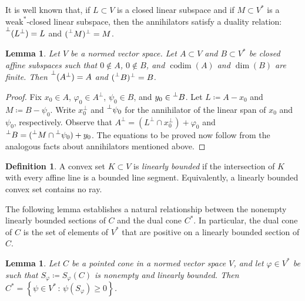 \documentclass[10pt]{amsart}
\newtheorem{lemma}[thm]{Lemma}
\theoremstyle{definition}
\newtheorem{definition}[thm]{Definition}
\theoremstyle{remark}
\begin{document}
It is well known that, if $L \subset V$ is a closed linear
subspace and if $M \subset {{V}^{\ast}}$ is a {$\text{weak}^{\ast}$}-closed linear
subspace, then the annihilators satisfy a duality relation:
${\prescript{\perp}{}{{(L^{\perp})}}} = L$ and $({\prescript{\perp}{}{{M}}})^{\perp} = M$.

\begin{lemma}
   \label{lem:PerpIsADuality}
   Let $V$ be a normed vector space.  Let $A \subset V$ and $B
   \subset {{V}^{\ast}}$ be closed affine subspaces such that $0
   \notin A$, $0 \notin B$, and ${\operatorname{codim}}(A)$ and $\dim(B)$ are
   finite.  Then ${\prescript{\perp}{}{{(A^{\perp})}}} = A$ and
   $({\prescript{\perp}{}{{B}}})^{\perp} = B$.
\end{lemma}

\begin{proof}
   Fix $x_{0} \in A$, ${\varphi}_{0} \in A^{\perp}$, $\psi_{0} \in B$,
   and $y_{0} \in {\prescript{\perp}{}{{B}}}$.  Let $L {\mathrel{\coloneqq}} A - x_{0}$ and $M
   {\mathrel{\coloneqq}} B - \psi_{0}$.  Write $x_{0}^{\perp}$ and
   ${\prescript{\perp}{}{{\psi_{0}}}}$ for the annihilator of the linear span of
   $x_{0}$ and $\psi_{0}$, respectively.  Observe that $A^{\perp}
   = (L^{\perp} \cap x_{0}^{\perp}) + {\varphi}_{0}$ and ${\prescript{\perp}{}{{B}}} =
   ({\prescript{\perp}{}{{M}}} \cap {\prescript{\perp}{}{{\psi_{0}}}}) + y_{0}$.  The equations to
   be proved now follow from the analogous facts about
   annihilators mentioned above.
\end{proof}

\begin{definition}
   A convex set $K \subset V$ is \emph{linearly bounded} if the
   intersection of $K$ with every affine line is a bounded line
   segment.  Equivalently, a linearly bounded convex set contains
   no ray.
\end{definition}

The following lemma establishes a natural relationship between the
non\-empty linearly bounded sections of $ C $ and the dual cone $
C^{*} $.  In particular, the dual cone of $ C$ is the set of
elements of $ {V^{\ast}} $ that are positive on a linearly bounded
section of $ C $.

\begin{lemma}
   \label{lem:LinearBoundedSectionGeneratesCone}
   Let $C$ be a pointed cone in a normed vector space $V$, and let
   ${\varphi} \in {V^{\ast}}$ be such that $S_{\varphi} {\mathrel{\coloneqq}} S_{\varphi}(C)$
   is nonempty and linearly bounded.  Then ${C^{\ast}} = {\left\lbrace {\psi
   \in {V^{\ast}} {\,:\,} \psi(S_{\varphi}) \ge 0} \right\rbrace}$.
\end{lemma}
\end{document}
